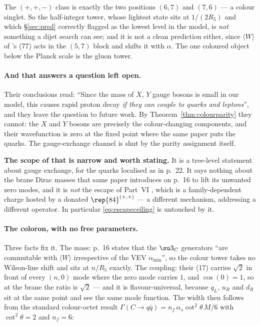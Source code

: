 \noindent The $(+,+,-)$ class is exactly the two positions $(6,7)$ and $(7,6)$ --- a colour
singlet. So the half-integer tower, whose lightest state sits at $1/(2R_5)$ and which
\S\ref{sec:pred} correctly flagged as the lowest level in the model, is \emph{not} something a
dijet search can see; and it is not a clean prediction either, since $\langle W\rangle$ of
\cite{KM25}'s (77) acts in the $(5,7)$ block and shifts it with $\alpha$. The one coloured object
below the Planck scale is the gluon tower.

\paragraph{And that answers a question \cite{KM25} left open.} Their conclusions read: ``Since the
mass of $X$, $Y$ gauge bosons is small in our model, this causes rapid proton decay \emph{if they
can couple to quarks and leptons}'', and they leave the question to future work. By
Theorem~\ref{thm:colourparity} they cannot: the $X$ and $Y$ bosons are precisely the
colour-changing components, and their wavefunction is zero at the fixed point where the same paper
puts the quarks. The gauge-exchange channel is shut by the parity assignment itself.

\noindent\textbf{The scope of that is narrow and worth stating.} It is a tree-level statement about
gauge exchange, for the quarks localised as in \cite{KM25} p.~22. It says nothing about the brane
Dirac masses that same paper introduces on p.~16 to lift its unwanted zero modes, and it is
\emph{not} the escape of Part~VI \cite{PartVI}, which is a family-dependent charge hosted by a
donated $\rep{84}^{(+,+)}$ --- a different mechanism, addressing a different operator. In
particular \eqref{eq:escapeceiling} is untouched by it.

\paragraph{The coloron, with no free parameters.} Three facts fix it. The mass: \cite{KM25} p.~16
states that the $\su3_C$ generators ``are commutable with $\langle W\rangle$ irrespective of the
VEV $\alpha_{\min}$'', so the colour tower takes no Wilson-line shift and sits at $n/R_5$ exactly.
The coupling: their (17) carries $\sqrt2$ in front of every $(n,0)$ mode where the zero mode
carries $1$, and $\cos(0)=1$, so at the brane the ratio is $\sqrt2$ --- and it is
flavour-universal, because $q_L$, $u_R$ and $d_R$ sit at the same point and see the same mode
function. The width then follows from the standard colour-octet result
$\Gamma(C\to q\bar q)=n_f\,\alpha_s\cot^2\theta\,M/6$ with $\cot^2\theta=2$ and $n_f=6$:

